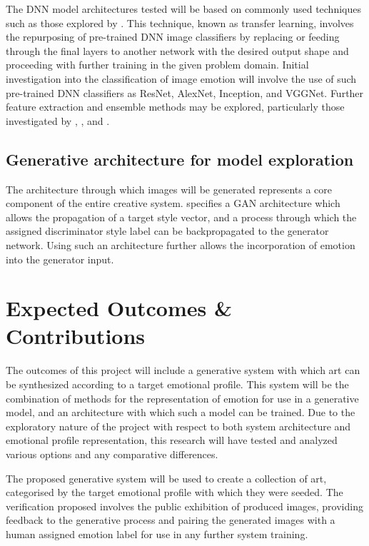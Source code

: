 \documentclass{article}
\begin{document}
The DNN model architectures tested will be based on commonly used techniques such as those explored by \citet{kim2018building, chen2015learning}.
This technique, known as transfer learning, involves the repurposing of pre-trained DNN image classifiers by replacing or feeding through the final layers to another network with the desired output shape and proceeding with further training in the given problem domain.
Initial investigation into the classification of image emotion will involve the use of such pre-trained DNN classifiers as ResNet, AlexNet, Inception, and VGGNet.
Further feature extraction and ensemble methods may be explored, particularly those investigated by \citet{kim2018building}, \citet{chen2015learning}, and \citet{chen2015learning}.

\subsection{Generative architecture for model exploration}

The architecture through which images will be generated represents a core component of the entire creative system.
\citet{tan2017artgan} specifies a GAN architecture which allows the propagation of a target style vector, and a process through which the assigned discriminator style label can be backpropagated to the generator network.
Using such an architecture further allows the incorporation of emotion into the generator input.


\section{Expected Outcomes \& Contributions}

The outcomes of this project will include a generative system with which art can be synthesized according to a target emotional profile.
This system will be the combination of methods for the representation of emotion for use in a generative model, and an architecture with which such a model can be trained.
Due to the exploratory nature of the project with respect to both system architecture and emotional profile representation, this research will have tested and analyzed various options and any comparative differences.

The proposed generative system will be used to create a collection of art, categorised by the target emotional profile with which they were seeded.
The verification proposed involves the public exhibition of produced images, providing feedback to the generative process and pairing the generated images with a human assigned emotion label for use in any further system training.




\end{document}
